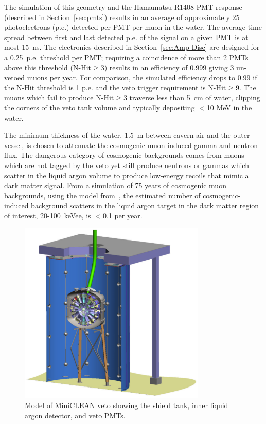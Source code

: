 \documentclass[review,number,sort&compress]{elsarticle}
\begin{document}
The simulation of this geometry and the Hamamatsu R1408 PMT response
(described in Section~\ref{sec:pmts}) results in an average of
approximately 25 photoelectrons (p.e.) detected per PMT per muon in
the water. The average time spread between first and last detected
p.e. of the signal on a given PMT is at most 15~ns. The electronics
described in Section~\ref{sec:Amp-Disc} are designed for a 0.25~p.e.
threshold per PMT; requiring a coincidence of more than 2 PMTs above
this threshold (N-Hit$\ge$3) results in an efficiency of 0.999 giving
3 un-vetoed muons per year. For comparison, the simulated efficiency
drops to 0.99 if the N-Hit threshold is 1 p.e. and the veto trigger
requirement is N-Hit$\ge$9. The muons which fail to produce N-Hit$\ge$3
traverse less than 5~cm of water, clipping the corners of the veto
tank volume and typically depositing $<$10 MeV in the water. 

The minimum thickness of the water, 1.5~m between cavern air and the
outer vessel, is chosen to attenuate the cosmogenic
muon-induced gamma and neutron flux.  The dangerous category of
cosmogenic backgrounds comes from muons which are not tagged by the
veto yet still produce neutrons or gammas which scatter in the liquid
argon volume to produce low-energy recoils that mimic a dark matter
signal.  From a simulation of 75 years of cosmogenic muon backgrounds,
using the model from~\cite{ref:mei_and_hime}, the estimated number of
cosmogenic-induced background scatters in the liquid argon target in
the dark matter region of interest, 20-100~keVee, is $<$0.1 per year.

\begin{figure}[ht]
\begin{center}
\includegraphics[width=3.5in]{graphics/miniclean_overview_drawing.pdf}
\caption{Model of MiniCLEAN veto showing the shield tank, inner liquid argon detector, and veto PMTs.
\label{fig:veto_geom}}
\end{center}
\end{figure}
\end{document}
